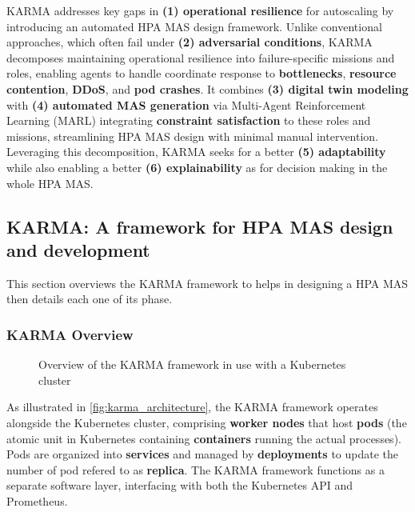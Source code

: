 KARMA addresses key gaps in \textbf{(1) operational resilience} for autoscaling by introducing an automated HPA MAS design framework. Unlike conventional approaches, which often fail under \textbf{(2) adversarial conditions}, KARMA decomposes maintaining operational resilience into failure-specific missions and roles, enabling agents to handle coordinate response to \textbf{bottlenecks}, \textbf{resource contention}, \textbf{DDoS}, and \textbf{pod crashes}. It combines \textbf{(3) digital twin modeling} with \textbf{(4) automated MAS generation} via Multi-Agent Reinforcement Learning (MARL) integrating \textbf{constraint satisfaction} to these roles and missions, streamlining HPA MAS design with minimal manual intervention. Leveraging this decomposition, KARMA seeks for a better \textbf{(5) adaptability} while also enabling a better \textbf{(6) explainability} as for decision making in the whole HPA MAS.


\subsection{KARMA: A framework for HPA MAS design and development}
\label{sec:proposed_approach}

This section overviews the KARMA framework to helps in designing a HPA MAS then details each one of its phase.

\subsubsection{KARMA Overview}

\begin{figure}[h!]
    \centering
    
    \caption{Overview of the KARMA framework in use with a Kubernetes cluster}
    \label{fig:karma_architecture}
\end{figure}

As illustrated in \autoref{fig:karma_architecture}, the KARMA framework operates alongside the Kubernetes cluster, comprising \textbf{worker nodes} that host \textbf{pods} (the atomic unit in Kubernetes containing \textbf{containers} running the actual processes). Pods are organized into \textbf{services} and managed by \textbf{deployments} to update the number of pod refered to as \textbf{replica}. The KARMA framework functions as a separate software layer, interfacing with both the Kubernetes API and Prometheus.

